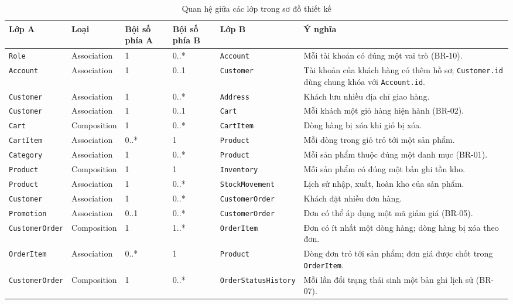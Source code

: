 \documentclass[12pt,a4paper,oneside]{report}
\begin{document}
\begin{longtable}{p{3.0cm}p{2.4cm}p{1.9cm}p{1.9cm}p{3.0cm}p{3.6cm}}
\caption{Quan hệ giữa các lớp trong sơ đồ thiết kế}\\
\toprule
\textbf{Lớp A} & \textbf{Loại} & \textbf{Bội số phía A} & \textbf{Bội số phía B} & \textbf{Lớp B} & \textbf{Ý nghĩa} \\
\midrule
\endhead
\bottomrule
\endlastfoot
\texttt{Role} & Association & 1 & 0..* & \texttt{Account} & Mỗi tài khoản có đúng một vai trò (BR-10). \\
\texttt{Account} & Association & 1 & 0..1 & \texttt{Customer} & Tài khoản của khách hàng có thêm hồ sơ; \texttt{Customer.id} dùng chung khóa với \texttt{Account.id}. \\
\texttt{Customer} & Association & 1 & 0..* & \texttt{Address} & Khách lưu nhiều địa chỉ giao hàng. \\
\texttt{Customer} & Association & 1 & 0..1 & \texttt{Cart} & Mỗi khách một giỏ hàng hiện hành (BR-02). \\
\texttt{Cart} & Composition & 1 & 0..* & \texttt{CartItem} & Dòng hàng bị xóa khi giỏ bị xóa. \\
\texttt{CartItem} & Association & 0..* & 1 & \texttt{Product} & Mỗi dòng trong giỏ trỏ tới một sản phẩm. \\
\texttt{Category} & Association & 1 & 0..* & \texttt{Product} & Mỗi sản phẩm thuộc đúng một danh mục (BR-01). \\
\texttt{Product} & Composition & 1 & 1 & \texttt{Inventory} & Mỗi sản phẩm có đúng một bản ghi tồn kho. \\
\texttt{Product} & Association & 1 & 0..* & \texttt{StockMovement} & Lịch sử nhập, xuất, hoàn kho của sản phẩm. \\
\texttt{Customer} & Association & 1 & 0..* & \texttt{CustomerOrder} & Khách đặt nhiều đơn hàng. \\
\texttt{Promotion} & Association & 0..1 & 0..* & \texttt{CustomerOrder} & Đơn có thể áp dụng một mã giảm giá (BR-05). \\
\texttt{CustomerOrder} & Composition & 1 & 1..* & \texttt{OrderItem} & Đơn có ít nhất một dòng hàng; dòng hàng bị xóa theo đơn. \\
\texttt{OrderItem} & Association & 0..* & 1 & \texttt{Product} & Dòng đơn trỏ tới sản phẩm; đơn giá được chốt trong \texttt{OrderItem}. \\
\texttt{CustomerOrder} & Composition & 1 & 0..* & \texttt{OrderStatusHistory} & Mỗi lần đổi trạng thái sinh một bản ghi lịch sử (BR-07). \\

\end{longtable}
\end{document}

